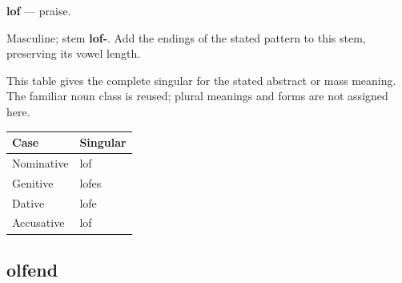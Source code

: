 \par\begin{minipage}{\linewidth}\raggedright
\textbf{lof} — praise.

Masculine; stem \textbf{lof-}. Add the endings of the stated pattern to this stem, preserving its vowel length.

This table gives the complete singular for the stated abstract or mass meaning. The familiar noun class is reused; plural meanings and forms are not assigned here.

\par\begingroup
\fontsize{10.5}{13.2}\selectfont
\setlength{\LTleft}{0pt}\setlength{\LTright}{\fill}
\noindent
\begin{tabular}{@{}>{\raggedright\arraybackslash}p{60.59mm}>{\raggedright\arraybackslash}p{60.59mm}@{}}
\toprule
\textbf{Case} & \textbf{Singular} \\
\midrule
Nominative & lof \\
Genitive & lofes \\
Dative & lofe \\
Accusative & lof \\
\bottomrule
\end{tabular}
\par\endgroup

\end{minipage}\par
{}
\subsection*{olfend}

